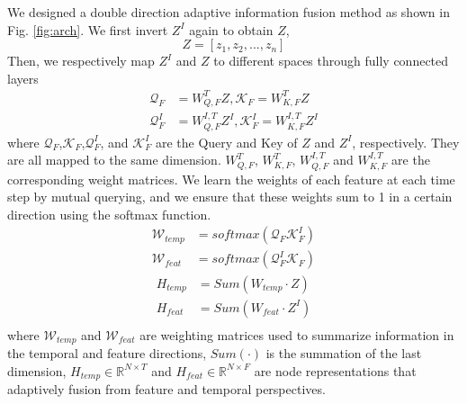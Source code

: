 We designed a double direction adaptive information fusion method as shown in Fig. \ref{fig:arch}. We first invert $Z^{I}$ again to obtain $Z$,
\begin{equation}
        Z=[z_{1},z_{2},...,z_{n}]
\end{equation}
Then, we respectively map $Z^{I}$ and $Z$ to different spaces through fully connected layers
\begin{equation}
\begin{split}
    \mathcal{Q}_{F} &= {W_{Q,F}^{T}} {Z}, \mathcal{K}_{F}= {W_{K,F}^{T}} {Z}\\
    \mathcal{Q}^{I}_{F} &= {W_{Q,F}^{I,T}} {Z^{I}}, \mathcal{K}^{I}_{F}= {W_{K,F}^{I,T}} {Z^{I}}
\end{split}
\end{equation}
where $\mathcal{Q}_{F}$,$\mathcal{K}_{F}$,$ \mathcal{Q}^{I}_{F}$, and $\mathcal{K}^{I}_{F}$ are the Query and Key of $Z$ and $Z^{I}$, respectively. They are all mapped to the same dimension. $W_{Q,F}^{T}$, $W_{K,F}^{T}$, $W_{Q,F}^{I,T}$ and ${W_{K,F}^{I,T}}$ are the corresponding weight matrices. We learn the weights of each feature at each time step by mutual querying, and we ensure that these weights sum to 1 in a certain direction using the softmax function.
\begin{equation}
\begin{split}
\mathcal{W}_{temp} &= softmax( \mathcal{Q}_{F}\mathcal{K}^{I}_{F})\\
        \mathcal{W}_{feat} &= softmax( \mathcal{Q}^{I}_{F}\mathcal{K}_{F})
\end{split}
\end{equation}
\begin{equation}
\begin{split}
    H_{temp} &= Sum(W_{temp}\cdot Z)\\
       H_{feat} &= Sum(W_{feat}\cdot Z^{I})\\
\end{split}
\end{equation}
where $\mathcal{W}_{temp} $ and $\mathcal{W}_{feat}$ are weighting matrices used to summarize information in the temporal and feature directions, $Sum(\cdot)$ is the summation of the last dimension, $H_{temp} \in \mathbb{R}^{N \times T} $ and $H_{feat} \in \mathbb{R}^{N \times F} $  are node representations that adaptively fusion from feature and temporal perspectives.  

